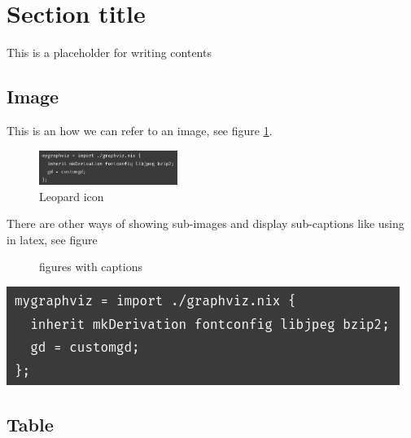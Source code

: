 \documentclass[a4paper,11pt]{article}
\author{Ryu Shinyoung}
\date{}
\title{}
\begin{document}
\section*{Section title}
\label{sec:org7f4bfb5}

This is a placeholder for writing contents


\subsection*{Image}
\label{sec:org8b746d0}

This is an how we can refer to an image, see figure \ref{fig:leopard-icon}.

\begin{figure}[htbp]
\centering
\includegraphics[width=0.4\textwidth]{../../img/7/Input pattern.png}
\caption{\label{fig:leopard-icon}Leopard icon}
\end{figure}

There are other ways of showing sub-images and display sub-captions like using in latex,
see figure

\begin{figure}
    \centering
\caption{\label{fig:subfig}figures with captions}
\end{figure}
\begin{center}
\includegraphics[width=.9\linewidth]{../../img/7/Input pattern.png}
\end{center}

\subsection*{Table}
\label{sec:org8a95251}
\end{document}

